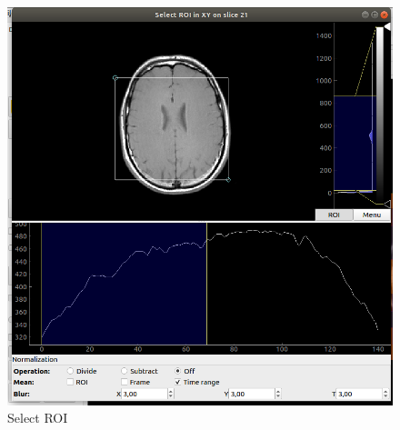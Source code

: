 \documentclass[12pt]{article}
\begin{document}
\begin{enumerate}
\begin{figure}[htbp]
		\includegraphics[width=\textwidth]{select_ROI.png}
		\caption[Select ROI]{Select ROI}
		\label{fig:select_ROI}
	\end{figure}
	
\end{enumerate}
\end{document}
